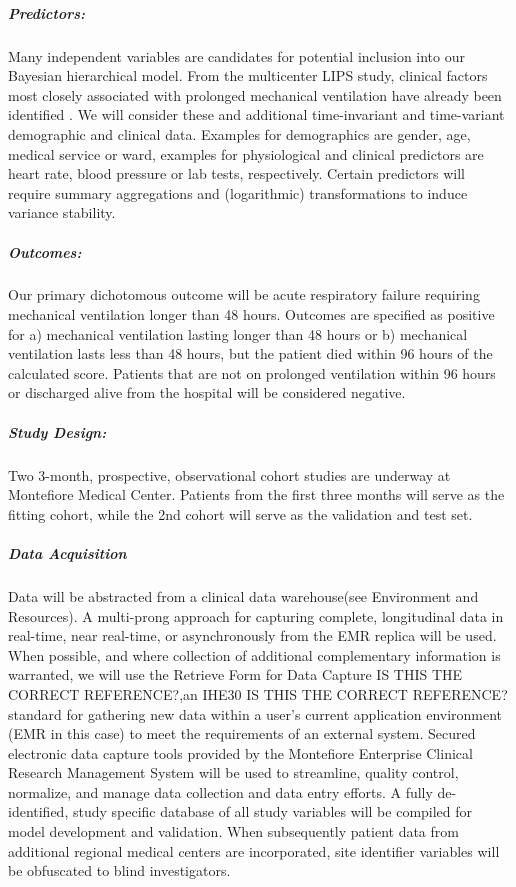 \documentclass[11pt,notitlepage]{article}
\begin{document}
\subparagraph*{Predictors:}
Many independent variables are candidates for potential inclusion into our Bayesian hierarchical model. From the multicenter LIPS study, clinical factors most closely associated with prolonged mechanical ventilation have already been identified \cite{Herridge_12594312}. We will consider these and additional time-invariant and time-variant demographic and clinical data. Examples for demographics are gender, age, medical service or ward, examples for physiological and clinical predictors are heart rate, blood pressure or lab tests, respectively. Certain predictors will require summary aggregations and (logarithmic) transformations to induce variance stability.

\subparagraph*{Outcomes:}
Our primary dichotomous outcome will be acute respiratory failure requiring mechanical ventilation longer than 48 hours. Outcomes are specified as positive for a) mechanical ventilation lasting longer than 48 hours or b) mechanical ventilation lasts less than 48 hours, but the patient died within 96 hours of the calculated score. Patients that are not on prolonged ventilation within 96 hours or discharged alive from the hospital will be considered negative.

\subparagraph*{Study Design:}
Two 3-month, prospective, observational cohort studies are underway at Montefiore Medical Center. Patients from the first three months will serve as the fitting cohort, while the 2nd cohort will serve as the validation and test set.

\subparagraph*{Data Acquisition}
Data will be abstracted from a clinical data warehouse(see Environment and Resources). A multi-prong approach for capturing complete, longitudinal data in real-time, near real-time, or asynchronously from the EMR replica will be used. When possible, and where collection of additional complementary information is warranted, we will use the Retrieve Form for Data Capture IS THIS THE CORRECT REFERENCE?\cite{Rothenhaeusler_2005},an IHE30 IS THIS THE CORRECT REFERENCE? \cite{Rotte_15809512} standard for gathering new data within a user's current application environment (EMR in this case) to meet the requirements of an external system. Secured electronic data capture tools provided by the Montefiore Enterprise Clinical Research Management System will be used to streamline, quality control, normalize, and manage data collection and data entry efforts. A fully de-identified, study specific database of all study variables will be compiled for model development and validation. When subsequently patient data from additional regional medical centers are incorporated, site identifier variables will be obfuscated to blind investigators.
\end{document}
